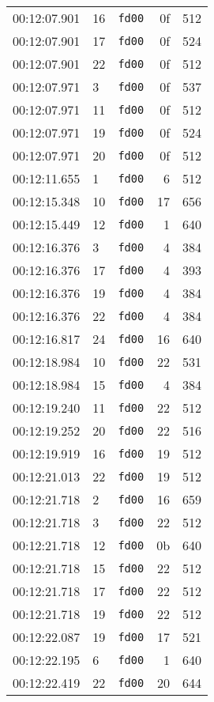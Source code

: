 \documentclass{article}
\begin{document}
\begin{longtable}{lllrr}
00:12:07.901 & 16 & \texttt{fd00} & 0f & 512 \\
00:12:07.901 & 17 & \texttt{fd00} & 0f & 524 \\
00:12:07.901 & 22 & \texttt{fd00} & 0f & 512 \\
00:12:07.971 & 3 & \texttt{fd00} & 0f & 537 \\
00:12:07.971 & 11 & \texttt{fd00} & 0f & 512 \\
00:12:07.971 & 19 & \texttt{fd00} & 0f & 524 \\
00:12:07.971 & 20 & \texttt{fd00} & 0f & 512 \\
00:12:11.655 & 1 & \texttt{fd00} & 6 & 512 \\
00:12:15.348 & 10 & \texttt{fd00} & 17 & 656 \\
00:12:15.449 & 12 & \texttt{fd00} & 1 & 640 \\
00:12:16.376 & 3 & \texttt{fd00} & 4 & 384 \\
00:12:16.376 & 17 & \texttt{fd00} & 4 & 393 \\
00:12:16.376 & 19 & \texttt{fd00} & 4 & 384 \\
00:12:16.376 & 22 & \texttt{fd00} & 4 & 384 \\
00:12:16.817 & 24 & \texttt{fd00} & 16 & 640 \\
00:12:18.984 & 10 & \texttt{fd00} & 22 & 531 \\
00:12:18.984 & 15 & \texttt{fd00} & 4 & 384 \\
00:12:19.240 & 11 & \texttt{fd00} & 22 & 512 \\
00:12:19.252 & 20 & \texttt{fd00} & 22 & 516 \\
00:12:19.919 & 16 & \texttt{fd00} & 19 & 512 \\
00:12:21.013 & 22 & \texttt{fd00} & 19 & 512 \\
00:12:21.718 & 2 & \texttt{fd00} & 16 & 659 \\
00:12:21.718 & 3 & \texttt{fd00} & 22 & 512 \\
00:12:21.718 & 12 & \texttt{fd00} & 0b & 640 \\
00:12:21.718 & 15 & \texttt{fd00} & 22 & 512 \\
00:12:21.718 & 17 & \texttt{fd00} & 22 & 512 \\
00:12:21.718 & 19 & \texttt{fd00} & 22 & 512 \\
00:12:22.087 & 19 & \texttt{fd00} & 17 & 521 \\
00:12:22.195 & 6 & \texttt{fd00} & 1 & 640 \\
00:12:22.419 & 22 & \texttt{fd00} & 20 & 644 \\

\end{longtable}
\end{document}
